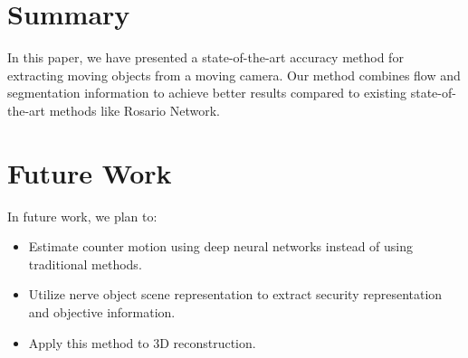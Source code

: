 \documentclass{article}
\begin{document}
\begin{multicols}{2}
\section{Summary}
In this paper, we have presented a state-of-the-art accuracy method for extracting moving objects from a moving camera. Our method combines flow and segmentation information to achieve better results compared to existing state-of-the-art methods like Rosario Network.

\section{Future Work}
In future work, we plan to:

\begin{itemize}
  \item Estimate counter motion using deep neural networks instead of using traditional methods.
  \item Utilize nerve object scene representation to extract security representation and objective information.
  \item Apply this method to 3D reconstruction.
\end{itemize}

\end{multicols}
\end{document}
